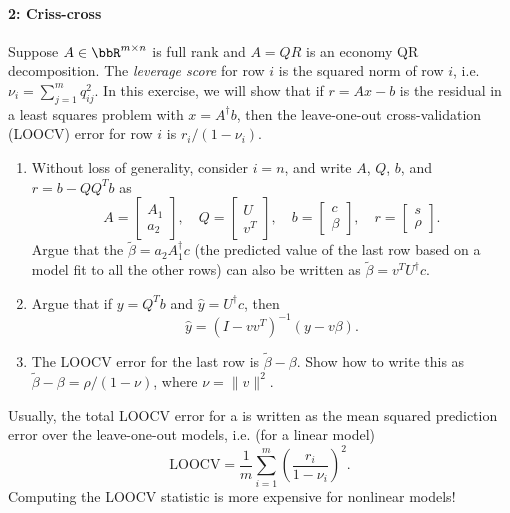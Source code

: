 \documentclass[12pt, leqno]{article} %
\begin{document}
\paragraph*{2: Criss-cross}
Suppose $A \in \bbR^{m \times n}$ is full rank and $A = QR$ is an
economy QR decomposition.  The {\em leverage score} for
row $i$ is the squared norm of row $i$,
i.e.~$\nu_i = \sum_{j=1}^m q_{ij}^2$.  In this exercise, we will show
that if $r = Ax-b$ is the residual in a least squares problem with
$x = A^\dagger b$, then the leave-one-out cross-validation (LOOCV) error
for row $i$ is $r_i/(1-\nu_i)$.
\begin{enumerate}
\item Without loss of generality, consider $i = n$, and write
  $A$, $Q$, $b$, and $r = b-QQ^T b$ as
  \[
    A = \begin{bmatrix} A_1 \\ a_2 \end{bmatrix}, \quad
    Q = \begin{bmatrix} U \\ v^T \end{bmatrix}, \quad
    b = \begin{bmatrix} c \\ \beta \end{bmatrix}, \quad
    r = \begin{bmatrix} s \\ \rho \end{bmatrix}.
  \]
  Argue that the $\tilde{\beta} = a_2 A_1^\dagger c$
  (the predicted value of the last row based on a model fit to
  all the other rows) can also be written as
  $\tilde{\beta} = v^T U^\dagger c$.
\item Argue that if $y = Q^T b$ and $\hat{y} = U^\dagger c$, then
  \[
    \hat{y} = (I-vv^T)^{-1} (y-v\beta).
  \]
\item The LOOCV error for the last row is $\tilde{\beta} - \beta$.
  Show how to write this as $\tilde{\beta} - \beta = \rho/(1-\nu)$,
  where $\nu = \|v\|^2$.
\end{enumerate}
Usually, the total LOOCV error for a is written as
the mean squared prediction error over the leave-one-out models, i.e.
(for a linear model)
\[
  \mathrm{LOOCV} =
  \frac{1}{m} \sum_{i=1}^m \left( \frac{r_i}{1-\nu_i} \right)^2.
\]
Computing the LOOCV statistic is more expensive for nonlinear models!
\end{document}
